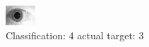 \begin{figure}[h!]
\begin{center}
\includegraphics[width=0.60\columnwidth]{figures/ID1886_class_4_target_3.png}
\end{center}
\caption{ Classification: 4 actual target: 3}
\label{fig:ID1886_class_4_target_3}
\end{figure}
